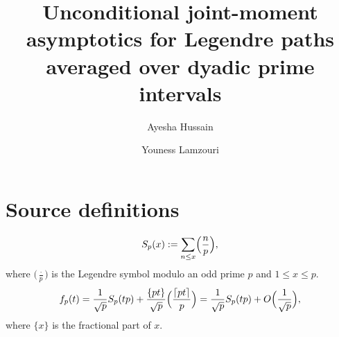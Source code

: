 \documentclass[10pt]{amsart}
\theoremstyle{plain}
\theoremstyle{definition}
\newcommand{\Legendre}[2]{\Bigl(\dfrac{#1}{#2}\Bigr)}
\begin{document}
\title{Unconditional joint-moment asymptotics for Legendre paths averaged over dyadic prime intervals}
\author{Ayesha Hussain \and Youness Lamzouri}
\maketitle
\section{Source definitions}
\begin{equation}\label{eq: definition of character sum}
S_p(x) := \sum_{n \leq x} \Legendre{n}{p},
\end{equation}
where $\bigl(\frac{\cdot}{p}\bigr)$ is the Legendre symbol modulo an odd prime $p$ and $1\leq x\leq p$.
\begin{equation}\label{Eq: RelationFpSp}
f_p(t) = \frac{1}{\sqrt{p}}S_p(tp) + \frac{\{ pt \}}{\sqrt{p}} \Legendre{\lceil pt \rceil }{p}= \frac{1}{\sqrt{p}}S_p(tp) + O\Bigl(\frac{1}{\sqrt{p}}\Bigr),
\end{equation}
where $\{x \}$ is the fractional part of $x$.
\end{document}
